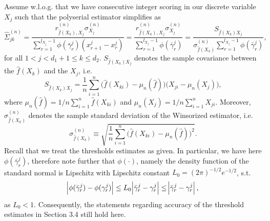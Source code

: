 Assume w.l.o.g. that we have consecutive integer scoring in our discrete variable $X_j$ such that the polyserial estimator simplifies as
\begin{equation}
    \hat{\Sigma}_{jk}^{(n)} = \frac{r^{(n)}_{\hat{f}(X_k),X_j} \sigma^{(n)}_{X_j}}{\sum_{r=1}^{l_{X_j}-1} \phi(\bar{\gamma}^j_r)(x^j_{r+1} - x^j_r)} = \frac{r^{(n)}_{\hat{f}(X_k),X_j} \sigma^{(n)}_{X_j}}{\sum_{r=1}^{l_{X_j}-1} \phi(\bar{\gamma}^j_r)} = \frac{S_{\hat{f}(X_k)X_j}}{\sigma^{(n)}_{\hat{f}(X_k)}\sum_{r=1}^{l_{X_j}-1} \phi(\bar{\gamma}^j_r)},
\end{equation}
for all $1 < j < d_1+1 \leq k \leq d_2$. $S_{\hat{f}(X_k)X_j}$ denotes the sample covariance between the $\hat{f}(X_k)$ and the $X_j$, i.e.
\begin{equation*}
    S_{\hat{f}(X_k)X_j} = \frac{1}{n}\sum_{i=1}^n \Big(\hat{f}(X_{ki}) - \mu_n(\hat{f})\Big)\Big(X_{ji} - \mu_n(X_j)\Big),
\end{equation*}
where $\mu_n(\hat{f}) = 1/n\sum_{i=1}^n\hat f(X_{ki})$ and $\mu_n(X_j) = 1/n\sum_{i=1}^n X_{ji}$. Moreover, $\sigma^{(n)}_{\hat{f}(X_k)}$ denotes the sample standard deviation of the Winsorized estimator, i.e.
\begin{equation*}
    \sigma^{(n)}_{\hat{f}(X_k)} \equiv \sqrt{\frac{1}{n}\sum_{i=1}^n \Big(\hat{f}(X_{ki}) - \mu_n(\hat{f})\Big)^2}.
\end{equation*}
Recall that we treat the thresholds estimates as given. In particular, we have here $\phi(\bar{\gamma}^j_r)$, therefore note further that $\phi(\cdot)$, namely the density function of the standard normal is Lipschitz with Lipschitz constant $L_0 = (2\pi)^{-1/2}e^{-1/2}$, s.t.
\begin{equation*}
    \abs{\phi(\bar{\gamma}_r^j) - \phi(\gamma_r^j)} \leq L_0 \abs{\bar{\gamma}_r^j - \gamma_r^j} \leq \abs{\bar{\gamma}_r^j - \gamma_r^j},
\end{equation*}
as $L_0 < 1$. Consequently, the statements regarding accuracy of the threshold estimates in Section 3.4 %
still hold here. 


